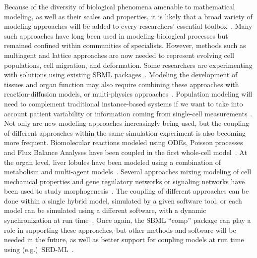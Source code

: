 \documentclass[]{draft-sbml-paper}
\begin{document}
Because of the diversity of biological phenomena amenable to mathematical modeling, as well as their scales and properties, it is likely that a broad variety of modeling approaches will be added to every researchers' essential toolbox~\citep{Cvijovic2014bridging}. Many such approaches have long been used in modeling biological processes but remained confined within communities of specialists. However, methods such as multiagent and lattice approaches are now needed to represent evolving cell populations, cell migration, and deformation. Some researchers are experimenting with solutions using existing SBML packages~\citep{watanabe2016efficient, varela2018epilog}.  Modeling the development of tissues and organ function may also require combining these approaches with reaction-diffusion models, or multi-physics approaches~\citep{Nickerson2016human}. Population modeling will need to complement traditional instance-based systems if we want to take into account patient variability or information coming from single-cell measurements~\citep{Levin1997mathematical}. Not only are new modeling approaches increasingly being used, but the coupling of different approaches within the same simulation experiment is also becoming more frequent. Biomolecular reactions modeled using ODEs, Poisson processes and Flux Balance Analyses have been coupled in the first whole-cell model~\citep{Karr2012a, Karr2015principles}. At the organ level, liver lobules have been modeled using a combination of metabolism and multi-agent models~\citep{schliess2014integrated}. Several approaches mixing modeling of cell mechanical properties and gene regulatory networks or signaling networks have been used to study morphogenesis~\citep{tanaka2015lbibcell, delile2017cell}. The coupling of different approaches can be done within a single hybrid model, simulated by a given software tool, or each model can be simulated using a different software, with a dynamic synchronization at run time~\citep{mattioni2013integration}.  Once again, the SBML ``comp'' package can play a role in supporting these approaches, but other methods and software will be needed in the future, as well as better support for coupling models at run time using (e.g.)\ SED-ML~\citep{waltemath2011reproducible, Kohn2008sedml}.
\end{document}

